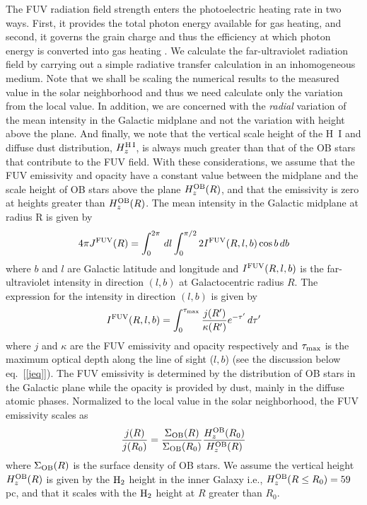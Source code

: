 \documentclass[12pt,preprint,flushrt]{aastex}
\begin{document}
The FUV radiation field strength enters the photoelectric
heating rate in two ways. First, it provides the total photon energy
available for gas heating, and second, it governs the grain charge and
thus the efficiency at which photon energy is converted into gas heating
\citep{wat72}.
We calculate the far-ultraviolet radiation field by carrying out a simple
radiative transfer calculation in an inhomogeneous medium.
Note that we shall be scaling the numerical
results to the measured value in the solar neighborhood and thus
we need calculate only the variation from the local value. In addition,
we are concerned with the {\it radial} variation of the mean intensity
in the Galactic midplane and not the variation with height above the plane.
And finally, we note that the vertical scale height of the H~I
and diffuse dust distribution, $H_z^{\rm H\, I}$,
is always much greater than that of the OB
stars that contribute to the FUV field. With these considerations,
we assume that the FUV emissivity and opacity
have a constant value between the midplane and the scale height of
OB stars above the plane $H_z^{\rm OB}(R)$, and that the emissivity is zero
at heights greater than $H_z^{\rm OB}(R)$. The mean intensity in the Galactic
midplane at radius R is given by
\begin{equation}\label{Jequation}
 4\pi J^{\rm FUV}(R) =  \int_0^{2\pi}\, dl \int_0^{\pi/2}2 I^{\rm FUV}(R,l,b)
 \cos b\, db
\end{equation}
where $b$ and $l$ are Galactic latitude and longitude and $I^{\rm FUV}(R,l,b)$
is the far-ultraviolet intensity in direction $(l,b)$
at Galactocentric radius $R$. The expression
for the intensity in direction $(l,b)$ is given by
\begin{equation}\label{Iequation}
    I^{\rm FUV}(R,l,b) = \int_0^{\tau_{\rm max}}\frac{j(R')}{\kappa(R')}
      e^{-\tau '}\, d\tau '
\end{equation}
where $j$ and $\kappa$ are the FUV emissivity and opacity respectively and
$\tau_{\rm max}$ is the maximum optical depth along
the line of sight ($l,b$) (see the discussion below eq.~[\ref{jeq}]).
The FUV emissivity is determined by the distribution of OB stars in
the Galactic plane while the opacity is provided by dust, mainly in the
diffuse atomic phases. Normalized to the
local value in the solar neighborhood, the FUV emissivity scales as
\begin{equation}\label{eq:emissiv}
     \frac{j(R)}{j(R_0)} =
\frac{\Sigma_{\rm OB}(R)}{\Sigma_{\rm OB}(R_0)}
\frac{H_z^{\rm OB}(R_0)}{H_z^{\rm OB}(R)}
\end{equation}
where $\Sigma_{\rm OB}(R)$ is the surface density of OB stars.
We assume the vertical height ${H_z^{\rm OB}(R)}$ is given by the
${\rm H_2}$ height in the inner Galaxy i.e.,
${H_z^{\rm OB}(R \le R_0)} = 59$ pc, and that it scales with the ${\rm H_2}$
height at $R$ greater than $R_0$.
\end{document}
